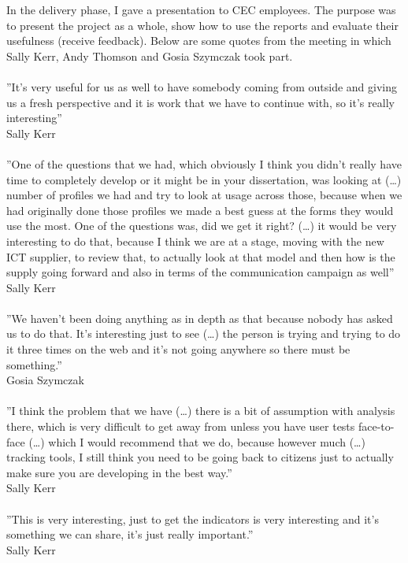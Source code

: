 In the delivery phase, I gave a presentation to CEC employees. The purpose was to present the project as a whole, show how to use the reports and evaluate their usefulness (receive feedback). Below are some quotes from the meeting in which Sally Kerr, Andy Thomson and Gosia Szymczak took part.\\\\
''It's very useful for us as well to have somebody coming from outside and giving us a fresh perspective and it is work that we have to continue with, so it's really interesting''\\
Sally Kerr\\\\
''One of the questions that we had, which obviously I think you didn't really have time to completely develop or it might be in your dissertation, was looking at (…) number of profiles we had and try to look at usage across those, because when we had originally done those profiles we made a best guess at the forms they would use the most. One of the questions was, did we get it right? (…) it would be very interesting to do that, because I think we are at a stage, moving with the new ICT supplier, to review that, to actually look at that model and then how is the supply going forward and also in terms of the communication campaign as well''\\
Sally Kerr\\\\
''We haven't been doing anything as in depth as that because nobody has asked us to do that. It's interesting just to see (…) the person is trying and trying to do it three times on the web and it's not going anywhere so there must be something.''\\
Gosia Szymczak\\\\
''I think the problem that we have (…) there is a bit of assumption with analysis there, which is very difficult to get away from unless you have user tests face-to-face (…) which I would recommend that we do, because however much (…) tracking tools, I still think you need to be going back to citizens just to actually make sure you are developing in the best way.''\\
Sally Kerr\\\\
''This is very interesting, just to get the indicators is very interesting and it's something we can share, it's just really important.''\\
Sally Kerr\\\\
